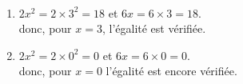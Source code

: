    \ \\ [-5mm]
   \begin{enumerate}
      \item $2x^2 =2\times3^2 =18$ et $6x =6\times3 =18$. \\
      donc, pour $x =3$, {\blue l'égalité est vérifiée}.
      \item $2x^2 =2\times0^2 =0$ et $6x =6\times0 =0$. \\
      donc, {\blue pour $x =0$} l'égalité est encore vérifiée.
   \end{enumerate}
